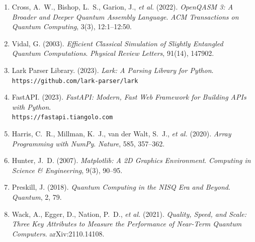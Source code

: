 \begin{enumerate}
\item Cross, A.~W., Bishop, L.~S., Garion, J., \textit{et al.} (2022). \textit{OpenQASM 3: A Broader and Deeper Quantum Assembly Language}. \textit{ACM Transactions on Quantum Computing}, 3(3), 12:1–12:50.

\item Vidal, G. (2003). \textit{Efficient Classical Simulation of Slightly Entangled Quantum Computations}. \textit{Physical Review Letters}, 91(14), 147902.

\item Lark Parser Library. (2023). \textit{Lark: A Parsing Library for Python}. \\ \texttt{https://github.com/lark-parser/lark}

\item FastAPI. (2023). \textit{FastAPI: Modern, Fast Web Framework for Building APIs with Python}. \\ \texttt{https://fastapi.tiangolo.com}

\item Harris, C.~R., Millman, K.~J., van der Walt, S.~J., \textit{et al.} (2020). \textit{Array Programming with NumPy}. \textit{Nature}, 585, 357–362.

\item Hunter, J.~D. (2007). \textit{Matplotlib: A 2D Graphics Environment}. \textit{Computing in Science \& Engineering}, 9(3), 90–95.

\item Preskill, J. (2018). \textit{Quantum Computing in the NISQ Era and Beyond}. \textit{Quantum}, 2, 79.

\item Wack, A., Egger, D., Nation, P.~D., \textit{et al.} (2021). \textit{Quality, Speed, and Scale: Three Key Attributes to Measure the Performance of Near-Term Quantum Computers}. arXiv:2110.14108.

\end{enumerate}

